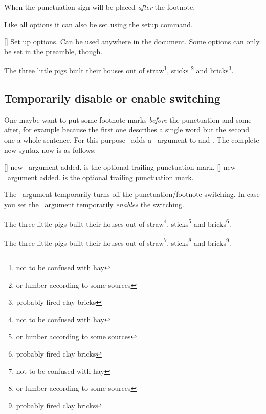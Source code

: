 \documentclass[load-preamble+]{cnltx-doc}
\begin{document}
\begin{options}
    When  the punctuation sign will be placed \emph{after} the
    footnote.
\end{options}
Like all options it can also be set using the setup command.
\begin{commands}
  []
    Set up options.  Can be used anywhere in the document.  Some options can
    only be set in the preamble, though.
\end{commands}
\begin{example}
    \begin{minipage}{\linewidth}
    \noindent The three little pigs built
    their houses out of straw\footnote{not
      to be confused with hay},  sticks%
    \footnote{or lumber according to some
      sources} and bricks\footnote{probably
      fired clay bricks}.
  \end{minipage}
\end{example}

\subsection{Temporarily disable or enable switching}
One maybe want to put some footnote marks \emph{before} the punctuation and
some after, for example because the first one describes a single word but the
second one a whole sentence.  For this purpose \fnpct\ adds a \sarg\ argument
to  and .  The complete new syntax now is as
follows:
\begin{commands}
  [\sarg{}]
    new \sarg\ argument added.   is the optional trailing
    punctuation mark.
  [\sarg{}]
    new \sarg\ argument added.   is the optional trailing
    punctuation mark.
\end{commands}
The \sarg\ argument temporarily turns off the punctuation/footnote switching.
In case you set  the \sarg\ argument temporarily
\emph{enables} the switching.
\begin{example}
  \begin{minipage}{.4\linewidth}
    \noindent The three little pigs built their houses
    out of straw\footnote*{not to be confused with hay},
    sticks\footnote{or lumber according to some sources}
    and bricks\footnote{probably fired clay bricks}.
  \end{minipage}\hfil
  \begin{minipage}{.4\linewidth}
    \noindent The three little pigs built their houses
    out of straw\footnote*{not to be confused with hay},
    sticks\footnote{or lumber according to some sources}
    and bricks\footnote{probably fired clay bricks}.
  \end{minipage}
\end{example}
\end{document}
